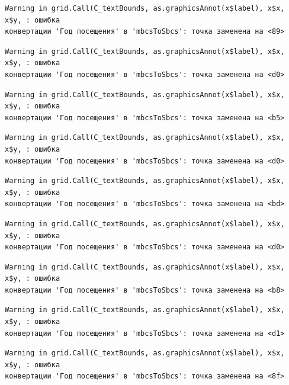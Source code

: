 \documentclass[
  letterpaper,
  DIV=11,
  numbers=noendperiod]{scrreprt}
\begin{document}
\begin{verbatim}
Warning in grid.Call(C_textBounds, as.graphicsAnnot(x$label), x$x, x$y, : ошибка
конвертации 'Год посещения' в 'mbcsToSbcs': точка заменена на <89>
\end{verbatim}

\begin{verbatim}
Warning in grid.Call(C_textBounds, as.graphicsAnnot(x$label), x$x, x$y, : ошибка
конвертации 'Год посещения' в 'mbcsToSbcs': точка заменена на <d0>
\end{verbatim}

\begin{verbatim}
Warning in grid.Call(C_textBounds, as.graphicsAnnot(x$label), x$x, x$y, : ошибка
конвертации 'Год посещения' в 'mbcsToSbcs': точка заменена на <b5>
\end{verbatim}

\begin{verbatim}
Warning in grid.Call(C_textBounds, as.graphicsAnnot(x$label), x$x, x$y, : ошибка
конвертации 'Год посещения' в 'mbcsToSbcs': точка заменена на <d0>
\end{verbatim}

\begin{verbatim}
Warning in grid.Call(C_textBounds, as.graphicsAnnot(x$label), x$x, x$y, : ошибка
конвертации 'Год посещения' в 'mbcsToSbcs': точка заменена на <bd>
\end{verbatim}

\begin{verbatim}
Warning in grid.Call(C_textBounds, as.graphicsAnnot(x$label), x$x, x$y, : ошибка
конвертации 'Год посещения' в 'mbcsToSbcs': точка заменена на <d0>
\end{verbatim}

\begin{verbatim}
Warning in grid.Call(C_textBounds, as.graphicsAnnot(x$label), x$x, x$y, : ошибка
конвертации 'Год посещения' в 'mbcsToSbcs': точка заменена на <b8>
\end{verbatim}

\begin{verbatim}
Warning in grid.Call(C_textBounds, as.graphicsAnnot(x$label), x$x, x$y, : ошибка
конвертации 'Год посещения' в 'mbcsToSbcs': точка заменена на <d1>
\end{verbatim}

\begin{verbatim}
Warning in grid.Call(C_textBounds, as.graphicsAnnot(x$label), x$x, x$y, : ошибка
конвертации 'Год посещения' в 'mbcsToSbcs': точка заменена на <8f>
\end{verbatim}
\end{document}
